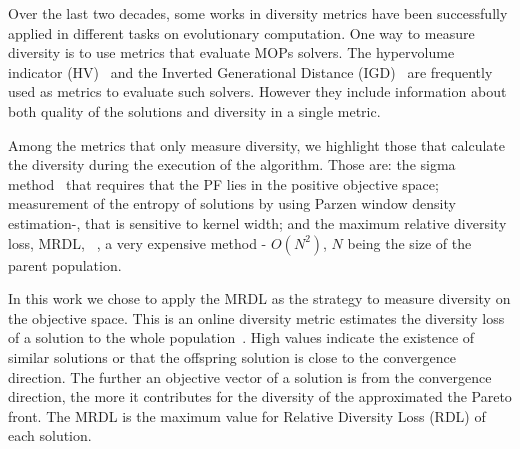 Over the last two decades, some works in diversity metrics have been successfully applied in different tasks on evolutionary computation. One way to measure diversity is to use metrics that evaluate MOPs solvers. The hypervolume indicator (HV)~\cite{zitzler1998multiobjective} and the Inverted Generational Distance (IGD)~\cite{zhang2008rm} are frequently used as metrics to evaluate such solvers. However they include information about both quality of the solutions and diversity in a single metric.

Among the metrics that only measure diversity, we highlight those that calculate the diversity during the execution of the algorithm. Those are: the sigma method~\cite{mostaghim2003strategies} that requires that the PF lies in the positive objective space; measurement of the entropy of solutions by using Parzen window density estimation-\cite{tan2008evolutionary}, that is sensitive to kernel width; and the maximum relative diversity loss, MRDL, ~\cite{gee2015online}, a very expensive method - $O(N^2)$, $N$ being the size of the parent population.


%

In this work we chose to apply the MRDL as the strategy to measure diversity on the objective space. This is an online diversity metric estimates the diversity loss of a solution to the whole population~\cite{gee2015online}. High values indicate the existence of similar solutions or that the offspring solution is close to the convergence direction. The further an objective vector of a solution is from the convergence direction, the more it contributes for the diversity of the approximated the Pareto front. The MRDL is the maximum value for Relative Diversity Loss (RDL) of each solution.

